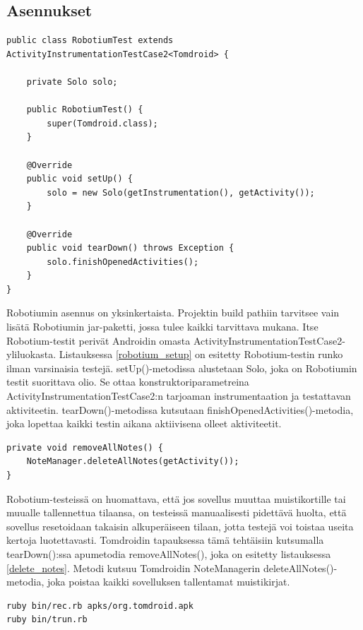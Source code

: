 \subsection{Asennukset}

\begin{lstlisting}[float,label=robotium_setup,caption=Robotium-testirunko]
public class RobotiumTest extends ActivityInstrumentationTestCase2<Tomdroid> {

	private Solo solo;
	
	public RobotiumTest() {
		super(Tomdroid.class);
	}
	
	@Override
	public void setUp() {
		solo = new Solo(getInstrumentation(), getActivity());
	}
	
	@Override
	public void tearDown() throws Exception {
		solo.finishOpenedActivities();
	}
}
\end{lstlisting}

Robotiumin asennus on yksinkertaista. Projektin build pathiin tarvitsee vain lisätä Robotiumin jar-paketti, jossa tulee kaikki tarvittava mukana. Itse Robotium-testit perivät Androidin omasta ActivityInstrumentationTestCase2-yliluokasta. Listauksessa \ref{robotium_setup} on esitetty Robotium-testin runko ilman varsinaisia testejä. setUp()-metodissa alustetaan Solo, joka on Robotiumin testit suorittava olio. Se ottaa konstruktoriparametreina ActivityInstrumentationTestCase2:n tarjoaman instrumentaation ja testattavan aktiviteetin. tearDown()-metodissa kutsutaan finishOpenedActivities()-metodia, joka lopettaa kaikki testin aikana aktiivisena olleet aktiviteetit.

\begin{lstlisting}[float,label=delete_notes,caption=Muistikirjojen poisto]
private void removeAllNotes() {
	NoteManager.deleteAllNotes(getActivity());
}
\end{lstlisting}

Robotium-testeissä on huomattava, että jos sovellus muuttaa muistikortille tai muualle tallennettua tilaansa, on testeissä manuaalisesti pidettävä huolta, että sovellus resetoidaan takaisin alkuperäiseen tilaan, jotta testejä voi toistaa useita kertoja luotettavasti. Tomdroidin tapauksessa tämä tehtäisiin kutsumalla tearDown():ssa apumetodia removeAllNotes(), joka on esitetty listauksessa \ref{delete_notes}. Metodi kutsuu Tomdroidin NoteManagerin deleteAllNotes()-metodia, joka poistaa kaikki sovelluksen tallentamat muistikirjat.

\begin{lstlisting}[float, label=troyd_run, caption=Troyd-nauhoitusskriptin ja testien ajaminen]
ruby bin/rec.rb apks/org.tomdroid.apk
ruby bin/trun.rb
\end{lstlisting}

